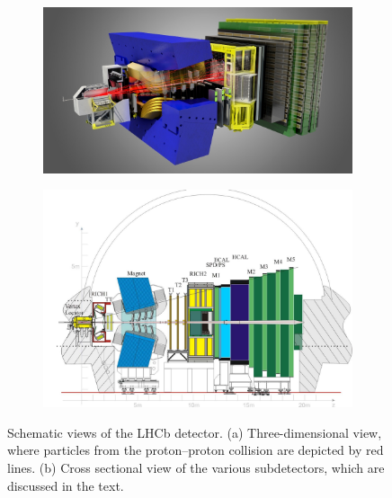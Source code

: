 \begin{figure}[ptb]
  \centering
  \begin{subfigure}{0.78\textwidth}
    \includegraphics[width=\textwidth]{graphics/intro/detector_3D.jpg}
    \caption{}
    \label{fig:LHCb_3D}
  \end{subfigure}

  \vspace*{0.03\textwidth}
  \begin{subfigure}{\textwidth}
    \includegraphics[width=\textwidth]{graphics/intro/detector_cross}
    \caption{}
    \label{fig:LHCb_cross}
  \end{subfigure}

  \caption{Schematic views of the LHCb detector.
           (a) Three-dimensional view, where particles from the proton--proton collision are depicted by red lines.
           (b) Cross sectional view of the various subdetectors, which are discussed in the text.}
  \label{fig:LHCb}
\end{figure}

